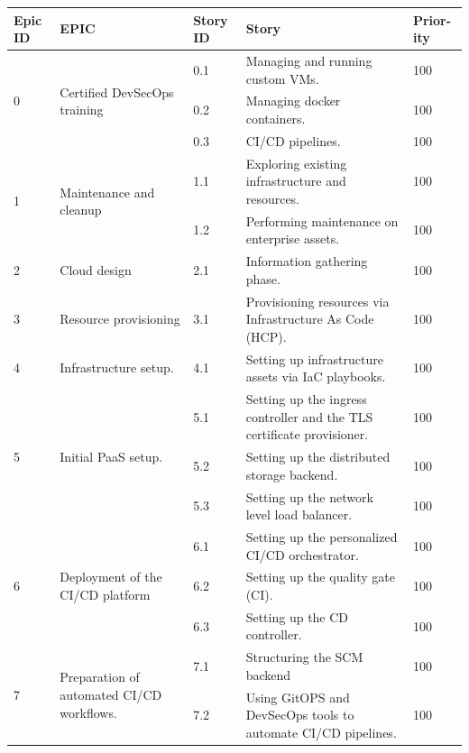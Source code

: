 \begin{longtable}[H]{|m{1cm}|m{3.25cm}|m{1cm}|m{7cm}|m{1.2cm}|}
\hline
 {\textbf{Epic ID}} & {\textbf{EPIC}} & {\textbf{Story ID}} & {\textbf{Story}} & {\textbf{Prior-ity}} \\
\endhead
\hline
\multirow{3}{1cm}{0} & \multirow{3}{3.25cm}{\raggedright Certified DevSecOps training} &	0.1 &	Managing and running custom VMs. & 100\\
\cline{3-5}
&   & 0.2 &	Managing docker containers.	& 100\\
\cline{3-5}
&   & 0.3 &	CI/CD pipelines. & 100\\
\hline
\multirow{2}{1cm}{1} & \multirow{2}{3.25cm}{Maintenance and cleanup} &	1.1	& Exploring existing infrastructure and resources. & 100\\
\cline{3-5}
&   &	1.2 & Performing maintenance on enterprise assets. & 100\\

\hline
2 & Cloud design &	2.1 &	Information gathering phase. & 100\\
\hline
3 & Resource provisioning &	3.1 &	Provisioning resources via Infrastructure As Code (HCP). & 100\\
\hline
4 & Infrastructure setup. &	4.1 &	Setting up infrastructure assets via IaC playbooks. & 100\\
\hline
\multirow{3}{1cm}{5} & \multirow{3}{3.25cm}{\raggedright Initial PaaS setup.} &	5.1 &	Setting up the ingress controller and the TLS certificate provisioner.	 & 100\\
\cline{3-5}
&   & 5.2 &	Setting up the distributed storage backend.	 & 100\\
\cline{3-5}
&   & 5.3 &	Setting up the network level load balancer.	 & 100\\
  \hline
\multirow{3}{1cm}{6} & \multirow{3}{3.25cm}{Deployment of the CI/CD platform} &	6.1 &	Setting up the personalized CI/CD orchestrator.	 & 100\\
\cline{3-5}
&   & 6.2 &	Setting up the quality gate (CI).	 & 100\\
\cline{3-5}
&   & 6.3 & Setting up the CD controller.	 & 100\\
  \hline
\multirow{2}{1cm}{7} & \multirow{2}{3.25cm}{\raggedright Preparation of automated CI/CD workflows.} &	7.1 &	Structuring the SCM backend	 & 100\\

\cline{3-5}
&   & 7.2 &	 \raggedright Using GitOPS and DevSecOps tools to automate CI/CD pipelines.	 & 100\\
\hline



\end{longtable}
